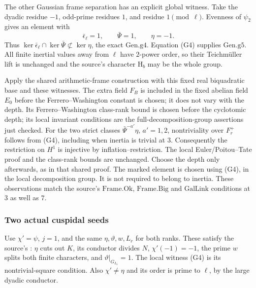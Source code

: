 The other Gaussian frame separation has an explicit
global witness.
Take the dyadic residue \(-1\), odd-prime residues \(1\),
and residue \(1\pmod\ell\).
Evenness of \(\psi_2\) gives an element with
\[
              \bar\epsilon_\ell=1,\qquad
              \bar\Psi=1,\qquad \eta=-1 .
 \tag{G5}
\]
Thus
\(\ker\bar\epsilon_\ell\cap\ker\bar\Psi
 \not\subset\ker\eta\), the exact \(\mathrm{Gen.g4}\).
Equation (G4) supplies \(\mathrm{Gen.g5}\).
All finite inertial values away from \(\ell\) have
\(2\)-power order, so their Teichm\"uller lift is
unchanged and the source's character \(\mathrm{H}_b\)
may be the whole group.

Apply the shared arithmetic-frame construction with this
fixed real biquadratic base and these witnesses.
The extra field \(F_B\) is included in the fixed
abelian field \(E_0\) before the Ferrero--Washington
constant is chosen; it does not vary with the depth.
Its Ferrero--Washington class-rank bound is chosen
before the cyclotomic depth; its local invariant
conditions are the full-decomposition-group assertions
just checked.
For the two strict classes
\(\bar\Psi^{-a'}\eta\), \(a'=1,2\), nontriviality over
\(F_r^+\) follows from (G4), including when inertia is
trivial at \(3\).
Consequently the restriction on \(H^1\) is injective
by inflation--restriction.
The local Euler/Poitou--Tate proof and the class-rank
bounds are unchanged.
Choose the depth only afterwards, as in that shared proof.
The marked element is chosen using (G4), in the local
decomposition group.
It is not required to belong to inertia.
These observations match the source's
\(\mathrm{Frame.Ok}\), \(\mathrm{Frame.Big}\) and
\(\mathrm{GalLink}\) conditions at \(3\) as well as \(7\).

\subsubsection{Two actual cuspidal seeds}
Use \(\chi'=\psi\), \(j=1\), and the same
\(\eta,\vartheta,w,L_r\) for both ranks.
These satisfy the source's
:
\(\eta\) cuts out \(K\), its conductor divides \(N\),
\(\chi'(-1)=-1\), the prime \(w\) splits both finite
characters, and \(\vartheta|_{G_{L_r}}=1\).
The local witness (G4) is its nontrivial-square condition.
Also \(\chi'\ne\eta\) and its order is prime to \(\ell\),
by the large dyadic conductor.

